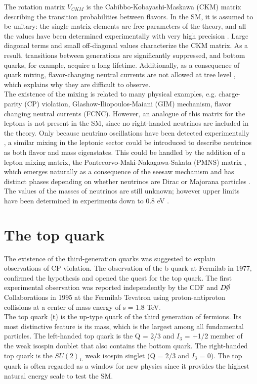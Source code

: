 The rotation matrix $V_{CKM}$ is the Cabibbo-Kobayashi-Maskawa (CKM) matrix describing the transition probabilities between flavors. In the SM, it is assumed to be unitary: the single matrix elements are free parameters of the theory, and all the values have been determined experimentally with very high precision \cite{alpigiani2017unitarity}. Large diagonal terms and small off-diagonal values characterize the CKM matrix. As a result, transitions between generations are significantly suppressed, and bottom quarks, for example, acquire a long lifetime. Additionally, as a consequence of quark mixing, flavor-changing neutral currents are not allowed at tree level \cite{PhysRevD.2.1285}, which explains why they are difficult to observe.\\
\indent The existence of the mixing is related to many physical examples, e.g. charge-parity (CP) violation, Glashow-Iliopoulos-Maiani (GIM) mechanism, flavor changing neutral currents (FCNC). However, an analogue of this matrix for the leptons is not present in the SM, since no right-handed neutrinos are included in the theory. Only because neutrino oscillations have been detected experimentally \cite{Fukuda_1998,Ahmad_2002,Agafonova_2018}, a similar mixing in the leptonic sector could be introduced to describe neutrinos as both flavor and mass eigenstates. This could be handled by the addition of a lepton mixing matrix, the Pontecorvo-Maki-Nakagawa-Sakata (PMNS) matrix \cite{10.1143/PTP.28.870, Pontecorvo:1957qd}, which emerges naturally as a consequence of the seesaw mechanism \cite{PhysRevLett.44.912} and has distinct phases depending on whether neutrinos are Dirac or Majorana particles \cite{BILENKY1980495}. The values of the masses of neutrinos are still unknown; however upper limits have been determined in experiments down to 0.8 eV \cite{aker2021direct}.

\section{\label{intro_top}The top quark}
\noindent The existence of the third-generation quarks was suggested to explain observations of CP violation. The observation of the b quark at Fermilab in 1977, confirmed the hypothesis and opened the quest for the top quark. The first experimental observation was reported independently by the CDF \cite{PhysRevLett.74.2626} and $D\cancel{0}$ \cite{PhysRevLett.74.2632} Collaborations in 1995 at the Fermilab Tevatron using proton-antiproton collisions at a center of mass energy of s = 1.8 TeV. \\
\indent The top quark (t) is the up-type quark of the third generation of fermions. Its most distinctive feature is its mass, which is the largest among all fundamental particles. The left-handed top quark is the Q = 2/3 and $I_3$ = +1/2 member of the weak isospin doublet that also contains the bottom quark. The right-handed top quark is the $SU(2)_L$ weak isospin singlet (Q = 2/3 and $I_3$ = 0). The top quark is often regarded as a window for new physics since it provides the highest natural energy scale to test the SM.
